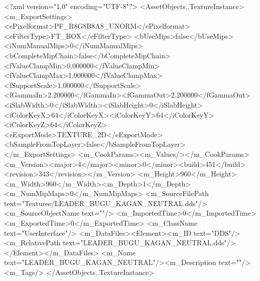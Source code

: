 <?xml version="1.0" encoding="UTF-8"?>
<AssetObjects..TextureInstance>
  <m_ExportSettings>
    <ePixelformat>PF_R8G8B8A8_UNORM</ePixelformat><eFilterType>FT_BOX</eFilterType>
    <bUseMips>false</bUseMips><iNumManualMips>0</iNumManualMips><bCompleteMipChain>false</bCompleteMipChain>
    <fValueClampMin>0.000000</fValueClampMin><fValueClampMax>1.000000</fValueClampMax><fSupportScale>1.000000</fSupportScale>
    <fGammaIn>2.200000</fGammaIn><fGammaOut>2.200000</fGammaOut><iSlabWidth>0</iSlabWidth><iSlabHeight>0</iSlabHeight>
    <iColorKeyX>64</iColorKeyX><iColorKeyY>64</iColorKeyY><iColorKeyZ>64</iColorKeyZ>
    <eExportMode>TEXTURE_2D</eExportMode><bSampleFromTopLayer>false</bSampleFromTopLayer>
  </m_ExportSettings>
  <m_CookParams><m_Values/></m_CookParams>
  <m_Version><major>4</major><minor>0</minor><build>451</build><revision>343</revision></m_Version>
  <m_Height>960</m_Height><m_Width>960</m_Width><m_Depth>1</m_Depth><m_NumMipMaps>0</m_NumMipMaps>
  <m_SourceFilePath text="Textures/LEADER_BUGU_KAGAN_NEUTRAL.dds"/><m_SourceObjectName text=""/>
  <m_ImportedTime>0</m_ImportedTime><m_ExportedTime>0</m_ExportedTime>
  <m_ClassName text="UserInterface"/>
  <m_DataFiles><Element><m_ID text="DDS"/><m_RelativePath text="LEADER_BUGU_KAGAN_NEUTRAL.dds"/></Element></m_DataFiles>
  <m_Name text="LEADER_BUGU_KAGAN_NEUTRAL"/><m_Description text=""/><m_Tags/>
</AssetObjects..TextureInstance>
